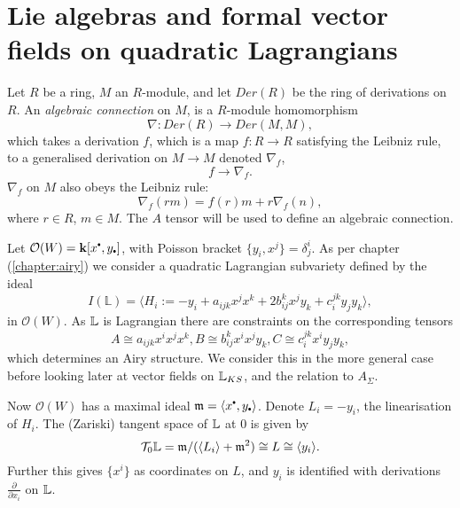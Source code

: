     \section{Lie algebras and formal vector fields on quadratic Lagrangians}
    \label{sec:vectorfields} 

    Let \(R\) be a ring, \(M\) an \(R\)-module, and let \( Der(R)\) be the ring of derivations on \(R\). An \emph{algebraic connection} on \(M\), is a \(R\)-module homomorphism
    \[ \nabla : Der(R) \rightarrow Der(M,M),\]
    which takes a derivation \(f\), which is a map \(f:R \rightarrow R \) satisfying the Leibniz rule, to a generalised derivation on \(M \rightarrow M\) denoted \( \nabla_f\),
    \[ f \rightarrow \nabla_f.\]
    \( \nabla_f\) on \(M\) also obeys the Leibniz rule:
    \[ \nabla_f ( r m ) = f(r) m  + r \nabla_f (n), \]
    where \( r \in R\), \( m \in M\). The \(A\) tensor will be used to define an algebraic connection.
    
    
    
    
    Let \( \mathcal{O}(W) = \mathbf{k}[x^{\sbt},y_{\sbt}]\), with Poisson bracket \( \{y_i, x^j \} = \delta^{i}_j\).  As per chapter (\ref{chapter:airy}) we consider a quadratic Lagrangian subvariety defined by the ideal 
    \[ I(\mathbb{L}) = \langle H_i := - y_i +  a_{ijk} x^j x^k  + 2 b_{ij}^k x^j y_k +  c_{i}^{jk} y_j y_k \rangle, \]
    in \( \mathcal{O}(W)\). As \( \mathbb{L}\) is Lagrangian there are constraints on the corresponding tensors 
    \[ A \cong a_{ijk}x^i x^j x^k,B\cong b_{ij}^k x^i x^j y_k,C \cong c_{i}^{jk} x^i y_j y_k,\] which  determines an Airy structure. We consider this in the more general case before looking later at vector fields on \( \mathbb{L}_{KS}\), and the relation to \(A_\Sigma\).
    
    Now \( \mathcal{O}(W)\) has a maximal ideal \(\mathfrak{m} = \langle x^{\sbt}, y_{\sbt} \rangle\).  Denote \( L_i = -y_i \), the linearisation of \(H_i\). The (Zariski) tangent space of \( \mathbb{L}\) at \(0\) is given by 
    \[  \mathcal{T}_0 \mathbb{L} = \mathfrak{m}/(\langle L_i \rangle  + \mathfrak{m}^2) \cong L \cong \langle y_i \rangle.  \] Further this gives \(\{x^i\}\) as coordinates on \(L\), and \(y_i\) is identified with derivations \( \frac{\partial}{\partial x_i}\) on \( \mathbb{L}\).

